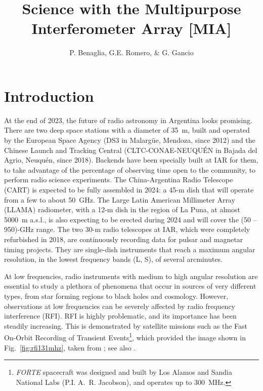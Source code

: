 \documentclass[baaa]{baaa}
\title{Science with the Multipurpose Interferometer Array [MIA]}
\author{
P. Benaglia\inst{1},
G.E. Romero\inst{1,2},
\&
G. Gancio\inst{1}
}
\institute{
Instituto Argentino de Radioastronom\'ia, CONICET--CICPBA--UNLP, Argentina
\and
Facultad de Ciencias Astron\'omicas y Geof{\'\i}sicas, UNLP, Argentina
}
\begin{document}
\maketitle
\section{Introduction}\label{S_intro}


At the end of 2023, the future of radio astronomy in Argentina looks promising. There are two deep space stations with a diameter of 35~m, built and operated by the European Space Agency (DS3 in Malargüe, Mendoza, since 2012) and the Chinese Launch and Tracking Central (CLTC-CONAE-NEUQUÉN in Bajada del Agrio, Neuquén, since 2018). Backends have been specially built at IAR for them, to take advantage of the percentage of observing time open to the community, to perform radio science experiments. The China-Argentina Radio Telescope (CART) is expected to be fully assembled in 2024: a 45-m dish that will operate from a few to about 50~GHz. The Large Latin American Millimeter Array (LLAMA) radiometer, with a 12-m dish in the region of La Puna, at almost 5000~m a.s.l., is also expecting to be erected during 2024 and will cover the (50 -- 950)-GHz range. The two 30-m radio telescopes at IAR, which were completely refurbished in 2018, are continuously recording data for pulsar and magnetar timing projects. They are single-dish instruments that reach a maximum angular resolution, in the lowest frequency bands (L, S), of several arcminutes.

At low frequencies, radio instruments with medium to high angular resolution are essential to study a plethora of phenomena that occur in sources of very different types, from star forming regions to black holes and cosmology. However, observations at low frequencies can be severely affected by radio frequency interference (RFI). RFI is highly problematic, and its importance has been steadily increasing. 
This is demonstrated by satellite missions such as the Fast On-Orbit Recording of Transient Events\footnote{{\sl FORTE} spacecraft was designed and built by Los Alamos and Sandia National Labs (P.I. A.~R. Jacobson), and operates up to 300~MHz.}, which provided the image shown in Fig.~\ref{fig:rfi131mhz}, taken from \citet{haggerty2010}; see also
\citet {light2020}. 
\end{document}
